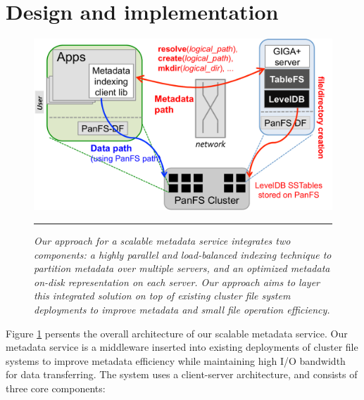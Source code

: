 \section{Design and implementation}

\begin{figure}[t]   %
\centerline{\includegraphics[scale=0.3]{./figs/giga-impl-leveldb-clusterfs}}
\vspace{10pt}
\caption{\textit{
Our approach for a scalable metadata service integrates two components: a highly
parallel and load-balanced indexing technique \cite{GIGA11}
to partition metadata over multiple servers,
and an optimized metadata on-disk representation \cite{TableFS} on each server.
Our approach aims to layer this integrated solution on top of existing cluster
file system deployments to improve metadata and small file operation efficiency.
}}
\vspace{10pt}
\hrule
\label{fig:design}
\end{figure}       %

Figure \ref{fig:design} persents the overall architecture of our scalable
metadata service. Our metadata service is a middleware inserted into
existing deployments of cluster file systems to improve metadata efficiency
while maintaining high I/O bandwidth for data transferring.
The system uses a client-server architecture,
and consists of three core components:

